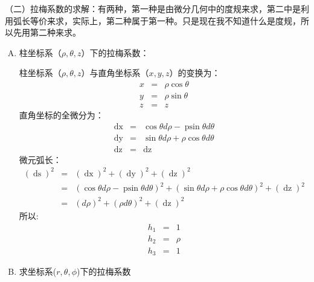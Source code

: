 \documentclass[UTF8]{ctexart}
\newcommand{\tmop}[1]{\ensuremath{\operatorname{#1}}}
\newenvironment{enumeratealphacap}{\begin{enumerate}[A.] }{\end{enumerate}}
\begin{document}
（二）拉梅系数的求解：有两种，第一种是由微分几何中的度规来求，第二中是利用弧长等价来求，实际上，第二种属于第一种。只是现在我不知道什么是度规，所以先用第二种来求。
\begin{enumeratealphacap}
  \item 柱坐标系（$\rho, \theta, z$）下的拉梅系数：
  
  柱坐标系（$\rho, \theta, z$）与直角坐标系（$x, y,
  z$）的变换为：
  \begin{eqnarray*}
    x & = & \rho \cos \theta\\
    y & = & \rho \sin \theta\\
    z & = & z
  \end{eqnarray*}
  直角坐标的全微分为：
  \begin{eqnarray*}
    \tmop{dx} & = & \cos \theta d \rho - \tmop{psin} \theta d \theta\\
    \tmop{dy} & = & \sin \theta d \rho + \rho \cos \theta d \theta\\
    \tmop{dz} & = & \tmop{dz}
  \end{eqnarray*}
  微元弧长：
  \begin{eqnarray*}
    (\tmop{ds})^2 & = & (\tmop{dx})^2 + (\tmop{dy})^2 + (\tmop{dz})^2\\
    & = & (\cos \theta d \rho - \tmop{psin} \theta d \theta)^2 + (\sin \theta
    d \rho + \rho \cos \theta d \theta)^2 + (\tmop{dz})^2\\
    & = & (d \rho)^2 + (\rho d \theta)^2 + (\tmop{dz})^2
  \end{eqnarray*}
  所以:
  \begin{eqnarray*}
    h_1 & = & 1\\
    h_2 & = & \rho\\
    h_3 & = & 1
  \end{eqnarray*}
  \item 求坐标系($r, \theta, \phi$)下的拉梅系数
  

\end{enumeratealphacap}
\end{document}
